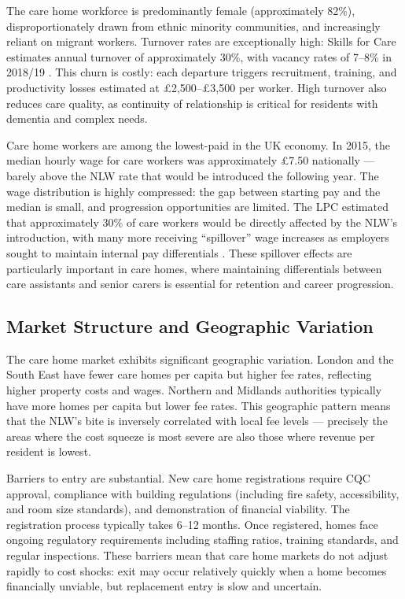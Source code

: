 \documentclass[12pt]{article}
\begin{document}
The care home workforce is predominantly female (approximately 82\%), disproportionately drawn from ethnic minority communities, and increasingly reliant on migrant workers. Turnover rates are exceptionally high: Skills for Care estimates annual turnover of approximately 30\%, with vacancy rates of 7--8\% in 2018/19 \citep{skills2019state}. This churn is costly: each departure triggers recruitment, training, and productivity losses estimated at \pounds2,500--\pounds3,500 per worker. High turnover also reduces care quality, as continuity of relationship is critical for residents with dementia and complex needs.

Care home workers are among the lowest-paid in the UK economy. In 2015, the median hourly wage for care workers was approximately \pounds7.50 nationally --- barely above the NLW rate that would be introduced the following year. The wage distribution is highly compressed: the gap between starting pay and the median is small, and progression opportunities are limited. The LPC estimated that approximately 30\% of care workers would be directly affected by the NLW's introduction, with many more receiving ``spillover'' wage increases as employers sought to maintain internal pay differentials \citep{lpc2016national}. These spillover effects are particularly important in care homes, where maintaining differentials between care assistants and senior carers is essential for retention and career progression.

\subsection{Market Structure and Geographic Variation}

The care home market exhibits significant geographic variation. London and the South East have fewer care homes per capita but higher fee rates, reflecting higher property costs and wages. Northern and Midlands authorities typically have more homes per capita but lower fee rates. This geographic pattern means that the NLW's bite is inversely correlated with local fee levels --- precisely the areas where the cost squeeze is most severe are also those where revenue per resident is lowest.

Barriers to entry are substantial. New care home registrations require CQC approval, compliance with building regulations (including fire safety, accessibility, and room size standards), and demonstration of financial viability. The registration process typically takes 6--12 months. Once registered, homes face ongoing regulatory requirements including staffing ratios, training standards, and regular inspections. These barriers mean that care home markets do not adjust rapidly to cost shocks: exit may occur relatively quickly when a home becomes financially unviable, but replacement entry is slow and uncertain.
\end{document}
